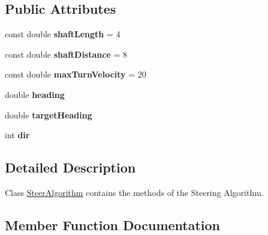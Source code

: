 \subsection*{Public Attributes}
\begin{DoxyCompactItemize}
\item 
const double {\bfseries shaft\+Length} = 4\hypertarget{class_steer_algorithm_a9d5bc20acba39f0e53c3d0f6fc280433}{}\label{class_steer_algorithm_a9d5bc20acba39f0e53c3d0f6fc280433}

\item 
const double {\bfseries shaft\+Distance} = 8\hypertarget{class_steer_algorithm_a38bc87552a30e8eda8f647cf341c9657}{}\label{class_steer_algorithm_a38bc87552a30e8eda8f647cf341c9657}

\item 
const double {\bfseries max\+Turn\+Velocity} = 20\hypertarget{class_steer_algorithm_acfce52839329f0ebb316f633494466e1}{}\label{class_steer_algorithm_acfce52839329f0ebb316f633494466e1}

\item 
double {\bfseries heading}\hypertarget{class_steer_algorithm_ada73b1f087245af5cda5d1d6b9be7d31}{}\label{class_steer_algorithm_ada73b1f087245af5cda5d1d6b9be7d31}

\item 
double {\bfseries target\+Heading}\hypertarget{class_steer_algorithm_a071efeb53e86ee949940b0ab10986044}{}\label{class_steer_algorithm_a071efeb53e86ee949940b0ab10986044}

\item 
int {\bfseries dir}\hypertarget{class_steer_algorithm_af6ad5604b62eec22cc2d385c7683d019}{}\label{class_steer_algorithm_af6ad5604b62eec22cc2d385c7683d019}

\end{DoxyCompactItemize}


\subsection{Detailed Description}
Class \hyperlink{class_steer_algorithm}{Steer\+Algorithm} contains the methods of the Steering Algorithm. 

\subsection{Member Function Documentation}
